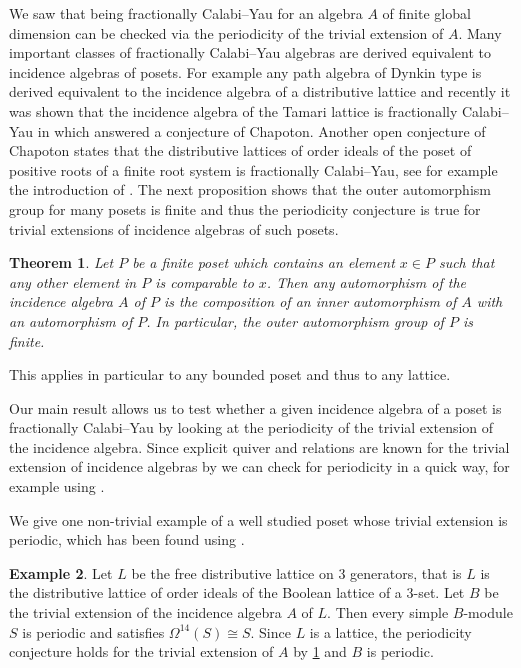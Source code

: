 \documentclass[a4paper,reqno,11pt]{amsart}
\newtheorem{theorem}{Theorem}[section]
\theoremstyle{definition}
\newtheorem{example}[theorem]{Example}
\newcommand{\new}[1]{{\blue #1}}
\numberwithin{equation}{section}
\begin{document}
\new{
\marginpar{move part of text to intro}
We saw that being fractionally Calabi--Yau for an algebra $A$ of finite global dimension can be checked via the periodicity of the trivial extension of $A$. Many important classes of fractionally Calabi--Yau algebras are derived equivalent to incidence algebras of posets. For example any path algebra of Dynkin type is derived equivalent to the incidence algebra of a distributive lattice and recently it was shown that the incidence algebra of the Tamari lattice is fractionally Calabi--Yau in \cite{R} which answered a conjecture of Chapoton. Another open conjecture of Chapoton states that the distributive lattices of order ideals of the poset of positive roots of a finite root system is fractionally Calabi--Yau, see for example the introduction of \cite{Y}. The next proposition shows that the outer automorphism group for many posets is finite and thus the periodicity conjecture is true for trivial extensions of incidence algebras of such posets.
\begin{theorem}\cite[Corollary 7.3.7]{SO} \label{outerautoposet}
Let $P$ be a finite poset which contains an element $x \in P$ such that any other element in $P$ is comparable to $x$. Then any automorphism of the incidence algebra $A$ of $P$ is the composition of an inner automorphism of $A$ with an automorphism of $P$. In particular, the outer automorphism group of $P$ is finite.

\end{theorem}
This applies in particular to any bounded poset and thus to any lattice.


Our main result allows us to test whether a given incidence algebra of a poset is fractionally Calabi--Yau by looking at the periodicity of the trivial extension of the incidence algebra.
Since explicit quiver and relations are known for the trivial extension of incidence algebras by \cite[Corollary 3.12]{FP} we can check for periodicity in a quick way, for example using \cite{QPA}.

We give one non-trivial example of a well studied poset whose trivial extension is periodic, which has been found using \cite{QPA}.
\begin{example}
Let $L$ be the free distributive lattice on 3 generators, that is $L$ is the distributive lattice of order ideals of the Boolean lattice of a 3-set. 
Let $B$ be the trivial extension of the incidence algebra $A$ of $L$. Then every simple $B$-module $S$ is periodic and satisfies $\Omega^{14}(S)\cong S$. Since $L$ is a lattice, the periodicity conjecture holds for the trivial extension of $A$ by \ref{outerautoposet} and $B$ is periodic.
\end{example}


}
\end{document}
